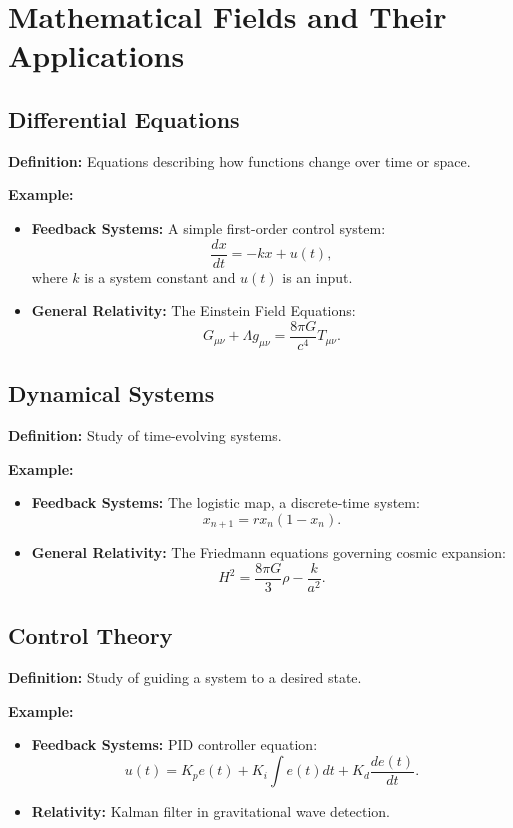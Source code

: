 \section{Mathematical Fields and Their Applications}

\subsection{Differential Equations}
\textbf{Definition:} Equations describing how functions change over time or space.

\textbf{Example:}
\begin{itemize}
    \item \textbf{Feedback Systems:} A simple first-order control system:
    \[
    \frac{dx}{dt} = -kx + u(t),
    \]
    where \( k \) is a system constant and \( u(t) \) is an input.
    \item \textbf{General Relativity:} The Einstein Field Equations:
    \[
    G_{\mu\nu} + \Lambda g_{\mu\nu} = \frac{8\pi G}{c^4} T_{\mu\nu}.
    \]
\end{itemize}

\subsection{Dynamical Systems}
\textbf{Definition:} Study of time-evolving systems.

\textbf{Example:}
\begin{itemize}
    \item \textbf{Feedback Systems:} The logistic map, a discrete-time system:
    \[
    x_{n+1} = r x_n (1 - x_n).
    \]
    \item \textbf{General Relativity:} The Friedmann equations governing cosmic expansion:
    \[
    H^2 = \frac{8\pi G}{3} \rho - \frac{k}{a^2}.
    \]
\end{itemize}

\subsection{Control Theory}
\textbf{Definition:} Study of guiding a system to a desired state.

\textbf{Example:}
\begin{itemize}
    \item \textbf{Feedback Systems:} PID controller equation:
    \[
    u(t) = K_p e(t) + K_i \int e(t) dt + K_d \frac{de(t)}{dt}.
    \]
    \item \textbf{Relativity:} Kalman filter in gravitational wave detection.
\end{itemize}

